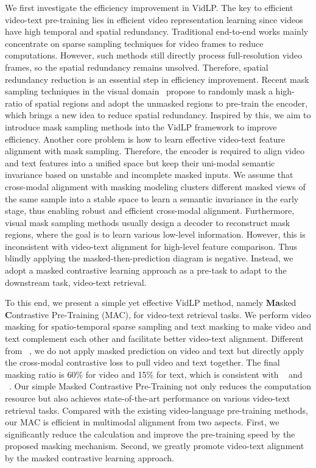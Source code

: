 \documentclass[10pt,twocolumn,letterpaper]{article}
\begin{document}
We first investigate the efficiency improvement in VidLP. 
The key to efficient video-text pre-training lies in efficient video representation learning since videos have high temporal and spatial redundancy. Traditional end-to-end works mainly concentrate on sparse sampling techniques for video frames to reduce computations. However, such methods still directly process full-resolution video frames, so the spatial redundancy remains unsolved. Therefore, spatial redundancy reduction is an essential step in efficiency improvement. Recent mask sampling techniques in the visual domain~\cite{mae,videomae,st_mae} propose to randomly mask a high-ratio of spatial regions and adopt the unmasked regions to pre-train the encoder, which brings a new idea to reduce spatial redundancy. 
Inspired by this, we aim to introduce mask sampling methods into the VidLP framework to improve efficiency. Another core problem is how to learn effective video-text feature alignment with mask sampling. 
Therefore, the encoder is required to align video and text features into a unified space but keep their uni-modal semantic invariance based on unstable and incomplete masked inputs. 
We assume that cross-modal alignment with masking modeling clusters different masked views of the same sample into a stable space to learn a semantic invariance in the early stage, thus enabling robust and efficient cross-modal alignment.
Furthermore, visual mask sampling methods usually design a decoder to reconstruct mask regions, where the goal is to learn various low-level information. However, this is inconsistent with video-text alignment for high-level feature comparison. Thus blindly applying the masked-then-prediction diagram is negative. Instead, we adopt a masked contrastive learning approach as a pre-task to adapt to the downstream task, video-text retrieval.



To this end, we present a simple yet effective VidLP method, namely \textbf{Ma}sked \textbf{C}ontrastive Pre-Training (MAC), for video-text retrieval tasks. We perform video masking for spatio-temporal sparse sampling and text masking to make video and text complement each other and facilitate better video-text alignment. Different from ~\cite{mae, beit, videomae, st_mae}, we do not apply masked prediction on video and text but directly apply the cross-modal contrastive loss to pull video and text together. The final masking ratio is 60\% for video and 15\% for text, which is consistent with ~\cite{bert} and ~\cite{mae,videomae}. Our simple Masked Contrastive Pre-Training not only reduces the computation resource but also achieves state-of-the-art performance on various video-text retrieval tasks. Compared with the existing video-language pre-training methods, our MAC is efficient in multimodal alignment from two aspects. First, we significantly reduce the calculation and improve the pre-training speed by the proposed masking mechanism. Second, we greatly promote video-text alignment by the masked contrastive learning approach.
\end{document}

